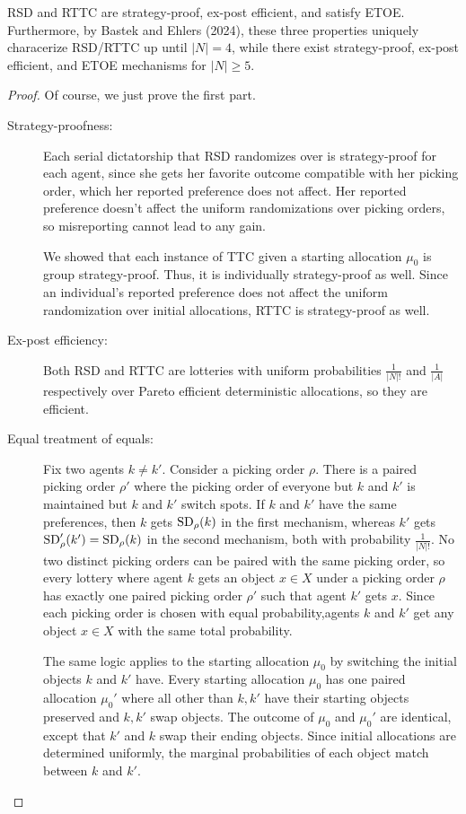 \begin{proposition}
	RSD and RTTC are strategy-proof, ex-post efficient, and satisfy ETOE.
	Furthermore, by Bastek and Ehlers (2024), these three properties uniquely characerize RSD/RTTC up until $\left| N \right| = 4$, while there exist strategy-proof, ex-post efficient, and ETOE mechanisms for $\left| N \right| \ge 5$.
\end{proposition}
\begin{proof}
	Of course, we just prove the first part.\\
	\begin{description}
		\item[Strategy-proofness:] 
			Each serial dictatorship that RSD randomizes over is strategy-proof for each agent, since she gets her favorite outcome compatible with her picking order, which her reported preference does not affect.
			Her reported preference doesn't affect the uniform randomizations over picking orders, so misreporting cannot lead to any gain.

			We showed that each instance of TTC given a starting allocation $\mu_0$ is group strategy-proof. Thus, it is individually strategy-proof as well. Since an individual's reported preference does not affect the uniform randomization over initial allocations, RTTC is strategy-proof as well.
		\item[Ex-post efficiency:]
			Both RSD and RTTC are lotteries with uniform probabilities $\frac{1}{\left| N \right|!}$ and $\frac{1}{\left| A \right|}$ respectively over Pareto efficient deterministic allocations, so they are efficient.
		\item[Equal treatment of equals:] 
			Fix two agents $k \ne k'$. Consider a picking order $\rho$. There is a paired picking order $\rho'$ where the picking order of everyone but $k$ and $k'$ is maintained but $k$ and $k'$ switch spots.
			If $k$ and $k'$ have the same preferences, then $k$ gets $\operatorname{SD}_\rho(k)$ in the first mechanism, whereas $k'$ gets $\operatorname{SD}_\rho'(k') = \operatorname{SD}_\rho(k)$ in the second mechanism, both with probability $\frac{1}{\left| N \right|!}$.
			No two distinct picking orders can be paired with the same picking order, so every lottery where agent $k$ gets an object $x \in X$ under a picking order $\rho$ has exactly one paired picking order $\rho'$ such that agent $k'$ gets $x$.
			Since each picking order is chosen with equal probability,agents $k$ and $k'$ get any object $x \in X$ with the same total probability.

			The same logic applies to the starting allocation $\mu_0$ by switching the initial objects $k$ and $k'$ have.
			Every starting allocation $\mu_0$ has one paired allocation $\mu_0'$ where all other than $k,k'$ have their starting objects preserved and $k,k'$ swap objects.
			The outcome of $\mu_0$ and $\mu_0'$ are identical, except that $k'$ and $k$ swap their ending objects.
			Since initial allocations are determined uniformly, the marginal probabilities of each object match between $k$ and $k'$.
	\end{description}
\end{proof}

